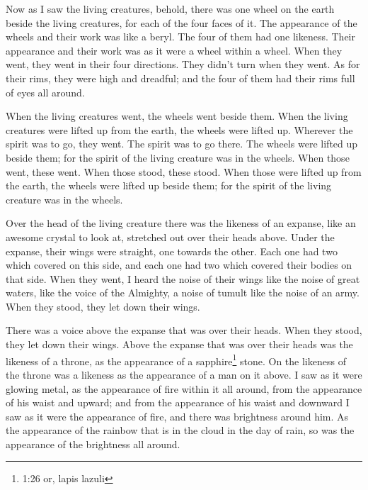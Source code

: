  Now as I saw the living creatures, behold, there was one
wheel on the earth beside the living creatures, for each of the four
faces of it.  The appearance of the wheels and their work
was like a beryl. The four of them had one likeness. Their appearance
and their work was as it were a wheel within a wheel.  When
they went, they went in their four directions. They didn't turn when
they went.  As for their rims, they were high and dreadful;
and the four of them had their rims full of eyes all around.

 When the living creatures went, the wheels went beside
them. When the living creatures were lifted up from the earth, the
wheels were lifted up.  Wherever the spirit was to go, they
went. The spirit was to go there. The wheels were lifted up beside them;
for the spirit of the living creature was in the wheels. 
When those went, these went. When those stood, these stood. When those
were lifted up from the earth, the wheels were lifted up beside them;
for the spirit of the living creature was in the wheels.

 Over the head of the living creature there was the
likeness of an expanse, like an awesome crystal to look at, stretched
out over their heads above.  Under the expanse, their wings
were straight, one towards the other. Each one had two which covered on
this side, and each one had two which covered their bodies on that side.
 When they went, I heard the noise of their wings like the
noise of great waters, like the voice of the Almighty, a noise of tumult
like the noise of an army. When they stood, they let down their wings.

 There was a voice above the expanse that was over their
heads. When they stood, they let down their wings.  Above
the expanse that was over their heads was the likeness of a throne, as
the appearance of a sapphire\footnote{1:26 or, lapis lazuli} stone. On
the likeness of the throne was a likeness as the appearance of a man on
it above.  I saw as it were glowing metal, as the
appearance of fire within it all around, from the appearance of his
waist and upward; and from the appearance of his waist and downward I
saw as it were the appearance of fire, and there was brightness around
him.  As the appearance of the rainbow that is in the cloud
in the day of rain, so was the appearance of the brightness all around.

